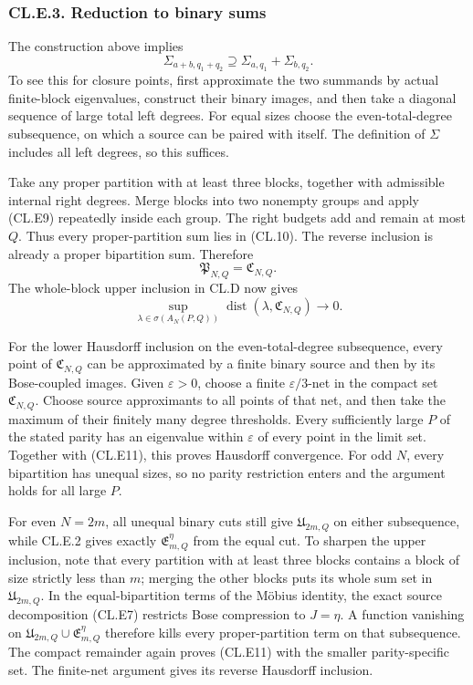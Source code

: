 \hypertarget{cl.e.3.-reduction-to-binary-sums}{%
\subsubsection{CL.E.3. Reduction to binary sums}\label{cl.e.3.-reduction-to-binary-sums}}

The construction above implies \[
\Sigma_{a+b,q_1+q_2}\supseteq
\Sigma_{a,q_1}+\Sigma_{b,q_2}.
\tag{CL.E9}
\] To see this for closure points, first approximate the two summands by actual finite-block eigenvalues, construct their binary images, and then take a diagonal sequence of large total left degrees. For equal sizes choose the even-total-degree subsequence, on which a source can be paired with itself. The definition of \(\Sigma\) includes all left degrees, so this suffices.

Take any proper partition with at least three blocks, together with admissible internal right degrees. Merge blocks into two nonempty groups and apply (CL.E9) repeatedly inside each group. The right budgets add and remain at most \(Q\). Thus every proper-partition sum lies in (CL.10). The reverse inclusion is already a proper bipartition sum. Therefore \[
\mathfrak P_{N,Q}=\mathfrak C_{N,Q}.
\tag{CL.E10}
\] The whole-block upper inclusion in CL.D now gives \[
\sup_{\lambda\in\sigma(A_N(P,Q))}
\operatorname{dist}(\lambda,\mathfrak C_{N,Q})\longrightarrow0.
\tag{CL.E11}
\]

For the lower Hausdorff inclusion on the even-total-degree subsequence, every point of \(\mathfrak C_{N,Q}\) can be approximated by a finite binary source and then by its Bose-coupled images. Given \(\varepsilon>0\), choose a finite \(\varepsilon/3\)-net in the compact set \(\mathfrak C_{N,Q}\). Choose source approximants to all points of that net, and then take the maximum of their finitely many degree thresholds. Every sufficiently large \(P\) of the stated parity has an eigenvalue within \(\varepsilon\) of every point in the limit set. Together with (CL.E11), this proves Hausdorff convergence. For odd \(N\), every bipartition has unequal sizes, so no parity restriction enters and the argument holds for all large \(P\).

For even \(N=2m\), all unequal binary cuts still give \(\mathfrak U_{2m,Q}\) on either subsequence, while CL.E.2 gives exactly \(\mathfrak E_{m,Q}^{\eta}\) from the equal cut. To sharpen the upper inclusion, note that every partition with at least three blocks contains a block of size strictly less than \(m\); merging the other blocks puts its whole sum set in \(\mathfrak U_{2m,Q}\). In the equal-bipartition terms of the Möbius identity, the exact source decomposition (CL.E7) restricts Bose compression to \(J=\eta\). A function vanishing on \(\mathfrak U_{2m,Q}\cup\mathfrak E_{m,Q}^{\eta}\) therefore kills every proper-partition term on that subsequence. The compact remainder again proves (CL.E11) with the smaller parity-specific set. The finite-net argument gives its reverse Hausdorff inclusion.

